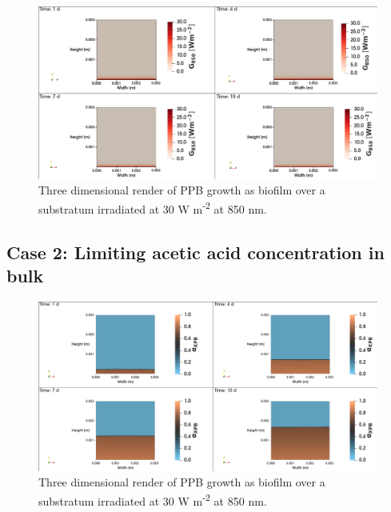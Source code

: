 \begin{figure}[H]
    \centering
    \includegraphics[width=\textwidth,height=0.4\textheight]{Chap4/results/post_processing/2D_cases/case1_rad.png}
    \caption{Three dimensional render of PPB growth as biofilm over a substratum irradiated at 30 W m\textsuperscript{-2} at 850 nm. } 
    \label{fig:case5_3D_ppb}
\end{figure}

\subsection{Case 2: Limiting acetic acid concentration in bulk}
\begin{figure}[H]
    \centering
    \includegraphics[width=\textwidth,height=0.4\textheight]{Chap4/results/post_processing/2D_cases/case2_ppb.png}
    \caption{Three dimensional render of PPB growth as biofilm over a substratum irradiated at 30 W m\textsuperscript{-2} at 850 nm. } 
    \label{fig:case5_3D_rad}
\end{figure}

